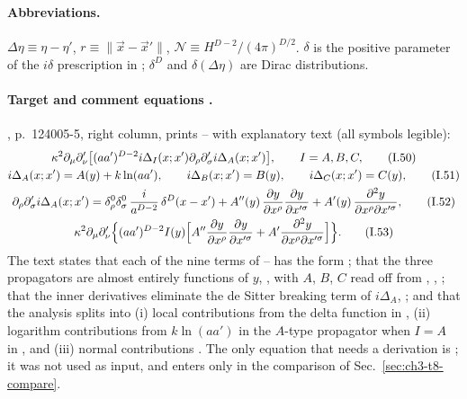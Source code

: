 \paragraph{Abbreviations.}
$\Delta\eta\equiv\eta-\eta'$, $r\equiv\|\vec x-\vec x'\|$, $\mathcal N\equiv H^{D-2}/(4\pi)^{D/2}$. $\delta$ is the positive parameter of the $i\delta$ prescription in ;
$\delta^D$ and $\delta(\Delta\eta)$ are Dirac distributions.

\paragraph{Target and comment equations \tP.}
\PI, p.~124005-5, right column, prints -- with explanatory text (all symbols legible):
\begin{gather}
\kappa^2\partial_\mu\partial'_\nu\big[(aa')^{D-2}i\Delta_I(x;x')\partial_\rho\partial'_\sigma i\Delta_A(x;x')\big],\qquad I=A,B,C,\tag*{\eqI{50}}\\
i\Delta_A(x;x')=A(y)+k\ln(aa'),\qquad i\Delta_B(x;x')=B(y),\qquad i\Delta_C(x;x')=C(y),\tag*{\eqI{51}}\\
\partial_\rho\partial'_\sigma i\Delta_A(x;x')=\delta^0_\rho\delta^0_\sigma\,\frac{i}{a^{D-2}}\,\delta^D(x-x')+A''(y)\,\frac{\partial y}{\partial x^\rho}\frac{\partial y}{\partial x'^\sigma}
+A'(y)\,\frac{\partial^2y}{\partial x^\rho\partial x'^\sigma},\tag*{\eqI{52}}\\
\kappa^2\partial_\mu\partial'_\nu\Big\{(aa')^{D-2}I(y)\Big[A''\frac{\partial y}{\partial x^\rho}\frac{\partial y}{\partial x'^\sigma}+A'\frac{\partial^2y}{\partial x^\rho\partial x'^\sigma}\Big]\Big\}.\tag*{\eqI{53}}
\end{gather}
The text states that each of the nine terms of -- has the form ; that the three propagators are almost entirely functions of $y$, , with
$A$, $B$, $C$ read off from , , ; that the inner derivatives eliminate the de Sitter breaking term of $i\Delta_A$, ; and that the analysis
splits into (i) local contributions from the delta function in , (ii) logarithm contributions from $k\ln(aa')$ in the $A$-type propagator when $I=A$ in ,
and (iii) normal contributions . The only equation that needs a derivation is ; it was not used as input, and enters only in the comparison of
Sec.~\ref{sec:ch3-t8-compare}.

